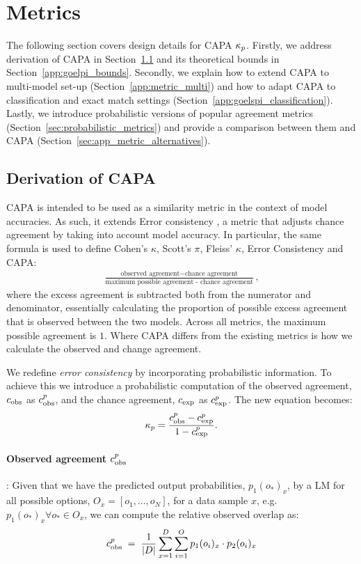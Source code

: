 \section{Metrics}
\label{app:metrics}
The following section covers design details for CAPA $\kappa_{p}$. Firstly, we address derivation of CAPA in Section~\ref{app:goelpi_derivation} and its theoretical bounds in Section~\ref{app:goelpi_bounds}. Secondly, we explain how to extend CAPA to multi-model set-up (Section~\ref{app:metric_multi}) and how to adapt CAPA to classification and exact match settings (Section~\ref{app:goelspi_classification}). Lastly, we introduce probabilistic versions of popular agreement metrics (Section~\ref{sec:probabilistic_metrics}) and provide a comparison between them and CAPA (Section~\ref{sec:app_metric_alternatives}). 

\subsection{Derivation of CAPA}
\label{app:goelpi_derivation}
CAPA is intended to be used as a similarity metric in the context of model accuracies. As such, it extends Error consistency \cite{geirhos2020beyond}, a metric that adjusts chance agreement by taking into account model accuracy. In particular, the same formula is used to define Cohen's $\kappa$, Scott's $\pi$, Fleiss' $\kappa$, Error Consistency and  CAPA:
\begin{align}
    \frac{\textrm{observed agreement} - \textrm{chance agreement}}{\textrm{maximum possible agreement - chance agreement}},
\end{align}
 where the excess agreement is subtracted both from the numerator and denominator, essentially calculating the proportion of possible excess agreement that is observed between the two models. Across all metrics, the maximum possible agreement is $1$. Where CAPA differs from the existing metrics is how we calculate the observed and change agreement. 

We redefine \textit{error consistency} \cite{geirhos2020beyond} by incorporating probabilistic information. To achieve this we introduce a probabilistic computation of the observed agreement, $c_{\text{obs}}$ as $c_{\text{obs}}^{p}$, and the chance agreement, $c_{\text{exp}}$ as $c_{\text{exp}}^{p}$. The new equation becomes: 
\begin{align}
    \kappa_{p} = \frac{c_{\text{obs}}^{p} - c_{\text{exp}}^{p}}{1 - c_{\text{exp}}^{p}}.
\end{align}

\paragraph{Observed agreement $c_{\text{obs}}^{p}$}: Given that we have the predicted output probabilities, $p_1(o_*)_x$, by a LM for all possible options, $O_x = [o_1, \dots, o_N]$,  for a data sample $x$, e.g. $p_1(o_*)_x \forall o_* \in O_x$, we can compute the relative observed overlap as:
\begin{align}
    c_{\text{obs}}^{p} \;=\; \frac{1}{|D|} \sum_{x=1}^D \sum_{i=1}^O p_1(o_i)_x \cdot p_2(o_i)_x
\end{align}

